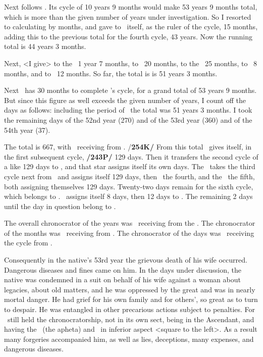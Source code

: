 Next follows \Mars. Its cycle of 10 years 9 months would make 53 years 9 months total, which is more than the given number of years under investigation. So I resorted to calculating by months, and gave to \Mars\, itself, as the ruler of the cycle, 15 months, adding this to the previous total for the fourth cycle, 43 years. Now the running total is 44 years 3 months. 

Next, <I give> to the \Sun\, 1 year 7 months, to \Mercury\, 20 months, to the \Moon\, 25 months, to \Venus\, 8 months, and to \Jupiter\, 12 months. So far, the total is is 51 years 3 months. 

Next \Saturn\, has 30 months to complete \Mars’s cycle, for a grand total of 53 years 9 months. But since this figure as well exceeds the given number of years, I count off the days as follows: including the period of \Jupiter\, the total was 51 years 3 months. I took the remaining days of the 52nd year (270) and of the 53rd year (360) and of the 54th year (37). 

The total is 667, with \Saturn\, receiving from \Mars. /\textbf{254K/} From this total \Saturn\, gives itself, in the first subsequent cycle, \textbf{/243P/} 129 days. Then it transfers the second cycle of a like 129 days to \Mars, and that star assigns itself its own days. The \Sun\, takes the third cycle next from \Saturn\, and assigns itself 129 days, then \Mercury\, the fourth, and the \Moon\, the fifth, both assigning themselves 129 days. Twenty-two days remain for the sixth cycle, which belongs to \Venus. \Venus\, assigns itself 8 days, then 12 days to \Jupiter. The remaining 2 days until the day in question belong to \Saturn. 

The overall chronocrator of the years was \Mars\, receiving from the \Moon. The chronocrator of the months was \Saturn\, receiving from \Mars. The chronocrator of the days was \Venus\, receiving the cycle from \Saturn. 

Consequently in the native’s 53rd year the grievous death of his wife occurred. Dangerous diseases and fines came on him. In the days under discussion, the native was condemned in a suit on behalf of his wife against a woman about legacies, about old matters, and he was oppressed by the great and was in nearly mortal danger. He had grief for his own family and for others’, so great as to turn to despair.
He was entangled in other precarious actions subject to penalties. For \Saturn\, still held the chronocratorship, not in its own sect, being in the Ascendant, and having the \Moon\, (the apheta) and \Mercury\, in inferior aspect <square to the left>. As a result many forgeries accompanied him, as well as lies, deceptions, many expenses, and dangerous diseases.


\newpage